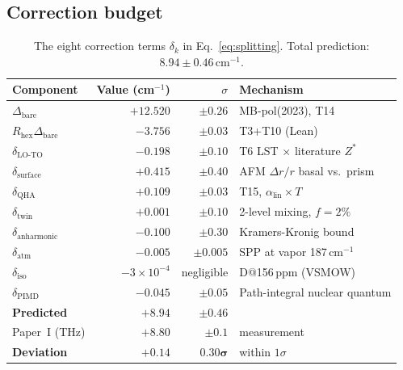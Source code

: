 \documentclass[11pt,a4paper]{article}
\begin{document}
\subsection{Correction budget}
\begin{table}[h]
\centering\small
\caption{The eight correction terms $\delta_k$ in Eq.~\ref{eq:splitting}. Total prediction: $8.94 \pm 0.46$\,cm$^{-1}$.}
\begin{tabular}{lrrl}
\toprule
Component & Value (cm$^{-1}$) & $\sigma$ & Mechanism \\
\midrule
$\Delta_\text{bare}$ & $+12.520$ & $\pm 0.26$ & MB-pol(2023), T14 \\
$R_\text{hex}\Delta_\text{bare}$ & $-3.756$ & $\pm 0.03$ & T3+T10 (Lean) \\
$\delta_\text{LO-TO}$ & $-0.198$ & $\pm 0.10$ & T6 LST $\times$ literature $Z^*$ \\
$\delta_\text{surface}$ & $+0.415$ & $\pm 0.40$ & AFM $\Delta r/r$ basal vs.\ prism \\
$\delta_\text{QHA}$ & $+0.109$ & $\pm 0.03$ & T15, $\alpha_\text{lin} \times T$ \\
$\delta_\text{twin}$ & $+0.001$ & $\pm 0.10$ & 2-level mixing, $f=2\%$ \\
$\delta_\text{anharmonic}$ & $-0.100$ & $\pm 0.30$ & Kramers-Kronig bound \\
$\delta_\text{atm}$ & $-0.005$ & $\pm 0.005$ & SPP at vapor 187\,cm$^{-1}$ \\
$\delta_\text{iso}$ & $-3{\times}10^{-4}$ & negligible & D@156\,ppm (VSMOW) \\
$\delta_\text{PIMD}$ & $-0.045$ & $\pm 0.05$ & Path-integral nuclear quantum \\
\midrule
\textbf{Predicted} & $\mathbf{+8.94}$ & $\mathbf{\pm 0.46}$ & \\
Paper~I (THz) & $+8.80$ & $\pm 0.1$ & measurement \\
\textbf{Deviation} & $+0.14$ & $\mathbf{0.30\sigma}$ & within $1\sigma$ \\
\bottomrule
\end{tabular}
\end{table}
\end{document}
